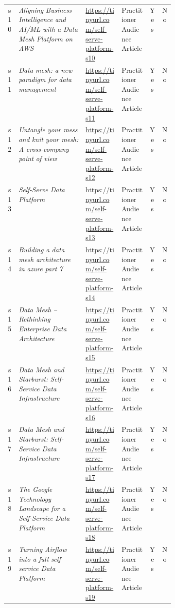 \begin{tabular}{|c|p{0.4\linewidth}|l|l|c|c|}
s10 &  {\em Aligning Business Intelligence and AI/ML with a Data Mesh Platform on AWS} & \href{https://https://tinyurl.com/self-serve-platform-s10}{https://tinyurl.com/self-serve-platform-s10} & Practitioner Audience Article & Yes & No\\
s11 &  {\em Data mesh: a new paradigm for data management} & \href{https://https://tinyurl.com/self-serve-platform-s11}{https://tinyurl.com/self-serve-platform-s11} & Practitioner Audience Article & Yes & No\\
s12 &  {\em Untangle your mess and knit your mesh: A cross-company point of view} & \href{https://www2.deloitte.com/content/dam/Deloitte/be/Documents/technology/consulting_untangle_your_mess_and_knit_your_mesh_deloitte_be_report_en.pdf}{https://tinyurl.com/self-serve-platform-s12} & Practitioner Audience Article & Yes & No\\
s13 &  {\em Self-Serve Data Platform} & \href{https://https://tinyurl.com/self-serve-platform-s13}{https://tinyurl.com/self-serve-platform-s13} & Practitioner Audience Article & Yes & No\\
s14 &  {\em Building a data mesh architecture in azure part 7} & \href{https://https://tinyurl.com/self-serve-platform-s14}{https://tinyurl.com/self-serve-platform-s14} & Practitioner Audience Article & Yes & No\\
s15 &  {\em Data Mesh – Rethinking Enterprise Data Architecture} & \href{https://https://tinyurl.com/self-serve-platform-s15}{https://tinyurl.com/self-serve-platform-s15} & Practitioner Audience Article & Yes & No\\
s16 &  {\em Data Mesh and Starburst: Self-Service Data Infrastructure} & \href{https://https://tinyurl.com/self-serve-platform-s16}{https://tinyurl.com/self-serve-platform-s16} & Practitioner Audience Article & Yes & No\\
s17 &  {\em Data Mesh and Starburst: Self-Service Data Infrastructure} & \href{https://https://tinyurl.com/self-serve-platform-s17}{https://tinyurl.com/self-serve-platform-s17} & Practitioner Audience Article & Yes & No\\
s18 &  {\em The Google Technology Landscape for a Self-Service Data Platform} & \href{https://www.linkedin.com/pulse/landscape-technologies-self-service-data-platform-sandeep/?trk=portfolio_article-card_title}{https://tinyurl.com/self-serve-platform-s18} & Practitioner Audience Article & Yes & No\\
s19 &  {\em Turning Airflow into a full self service Data Platform} & \href{https://https://tinyurl.com/self-serve-platform-s19}{https://tinyurl.com/self-serve-platform-s19} & Practitioner Audience Article & Yes & No\\

\end{tabular}
